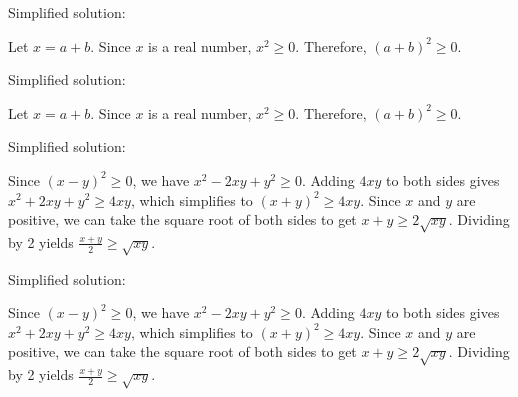 \documentclass{article}
\begin{document}



Simplified solution:
\begin{tcolorbox}[colback=blue!10, width=\linewidth]
Let $x = a+b$.  Since $x$ is a real number, $x^2 \ge 0$.  Therefore, $(a+b)^2 \ge 0$.

\end{tcolorbox}



Simplified solution:
\begin{tcolorbox}[colback=blue!10, width=\linewidth]
Let $x = a+b$.  Since $x$ is a real number, $x^2 \ge 0$.  Therefore, $(a+b)^2 \ge 0$.

\end{tcolorbox}



Simplified solution:
\begin{tcolorbox}[colback=blue!10, width=\linewidth]
Since $(x-y)^2 \ge 0$, we have $x^2 - 2xy + y^2 \ge 0$.  Adding $4xy$ to both sides gives $x^2 + 2xy + y^2 \ge 4xy$, which simplifies to $(x+y)^2 \ge 4xy$.  Since $x$ and $y$ are positive, we can take the square root of both sides to get $x+y \ge 2\sqrt{xy}$. Dividing by 2 yields $\frac{x+y}{2} \ge \sqrt{xy}$.
\end{tcolorbox}



Simplified solution:
\begin{tcolorbox}[colback=blue!10, width=\linewidth]
Since $(x-y)^2 \ge 0$, we have $x^2 - 2xy + y^2 \ge 0$.  Adding $4xy$ to both sides gives $x^2 + 2xy + y^2 \ge 4xy$, which simplifies to $(x+y)^2 \ge 4xy$.  Since $x$ and $y$ are positive, we can take the square root of both sides to get $x+y \ge 2\sqrt{xy}$. Dividing by 2 yields $\frac{x+y}{2} \ge \sqrt{xy}$.
\end{tcolorbox}
\end{document}
